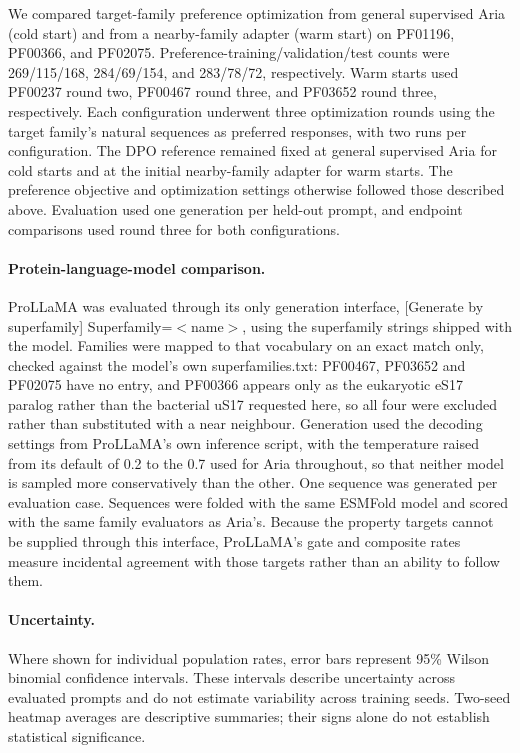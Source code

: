 \documentclass{article} %
\begin{document}
We compared target-family preference optimization from general
supervised Aria (cold start) and from a nearby-family adapter
(warm start) on PF01196, PF00366, and PF02075.
Preference-training/validation/test counts were 269/115/168,
284/69/154, and 283/78/72, respectively. Warm starts used
PF00237 round two, PF00467 round three, and PF03652 round three,
respectively. Each configuration underwent three optimization rounds
using the target family's natural sequences as preferred responses,
with two runs per configuration. The DPO reference remained fixed
at general supervised Aria for cold starts and at the initial
nearby-family adapter for warm starts. The preference objective and
optimization settings otherwise followed those described above.
Evaluation used one generation per held-out prompt, and endpoint
comparisons used round three for both configurations.

\paragraph{Protein-language-model comparison.}
ProLLaMA was evaluated through its only generation interface,
[Generate by superfamily] Superfamily=$<$name$>$, using the superfamily strings shipped with the model. Families were mapped to that vocabulary on an exact match only, checked against the model's own {superfamilies.txt}: PF00467, PF03652 and PF02075 have no entry, and PF00366 appears only as the eukaryotic eS17 paralog rather than the bacterial uS17 requested here, so all four were excluded rather than substituted with a near neighbour. Generation used the decoding settings from ProLLaMA's own inference script, with the temperature raised from its default of 0.2 to the 0.7 used for Aria throughout, so that neither model is sampled more conservatively than the other. One sequence was generated per evaluation case. Sequences were folded with the same ESMFold model and scored with the same family evaluators as Aria's. Because the property targets cannot be supplied through this interface, ProLLaMA's gate and composite rates measure incidental agreement with those targets rather than an ability to follow them.

\paragraph{Uncertainty.}
Where shown for individual population rates, error bars represent 95\% Wilson binomial confidence intervals. These intervals describe uncertainty across evaluated prompts and do not estimate variability across training seeds. Two-seed heatmap averages are descriptive summaries; their signs alone do not establish statistical significance. 
\end{document}
